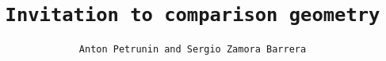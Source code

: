 \title{\tt Invitation to comparison geometry}
\author{\tt Anton Petrunin and Sergio Zamora Barrera}
\date{}
\maketitle










\thispagestyle{empty}
\newpage
\tableofcontents
